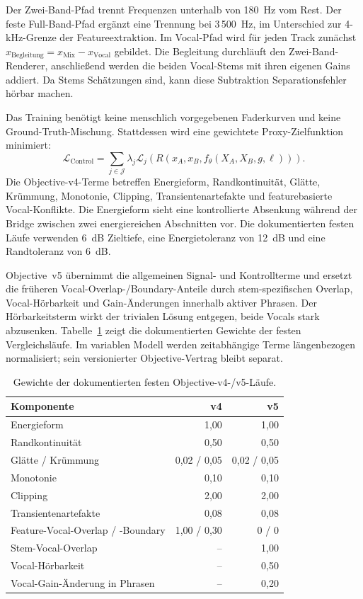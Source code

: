 Der Zwei-Band-Pfad trennt Frequenzen unterhalb von 180~Hz vom Rest. Der feste Full-Band-Pfad ergänzt eine Trennung bei 3\,500~Hz, im Unterschied zur 4-kHz-Grenze der Featureextraktion. Im Vocal-Pfad wird für jeden Track zunächst $x_{\mathrm{Begleitung}}=x_{\mathrm{Mix}}-x_{\mathrm{Vocal}}$ gebildet. Die Begleitung durchläuft den Zwei-Band-Renderer, anschließend werden die beiden Vocal-Stems mit ihren eigenen Gains addiert. Da Stems Schätzungen sind, kann diese Subtraktion Separationsfehler hörbar machen.

Das Training benötigt keine menschlich vorgegebenen Faderkurven und keine Ground-Truth-Mischung. Stattdessen wird eine gewichtete Proxy-Zielfunktion minimiert:
\begin{equation}
 \mathcal{L}_{\mathrm{Control}}=
 \sum_{j\in\mathcal{J}}\lambda_j\mathcal{L}_j
       (R(x_A,x_B,f_\theta(X_A,X_B,g,\ell))).
\end{equation}
Die Objective-v4-Terme betreffen Energieform, Randkontinuität, Glätte, Krümmung, Monotonie, Clipping, Transientenartefakte und featurebasierte Vocal-Konflikte. Die Energieform sieht eine kontrollierte Absenkung während der Bridge zwischen zwei energiereichen Abschnitten vor. Die dokumentierten festen Läufe verwenden 6~dB Zieltiefe, eine Energietoleranz von 12~dB und eine Randtoleranz von 6~dB.

Objective~v5 übernimmt die allgemeinen Signal- und Kontrollterme und ersetzt die früheren Vocal-Overlap-/Boundary-Anteile durch stem-spezifischen Overlap, Vocal-Hörbarkeit und Gain-Änderungen innerhalb aktiver Phrasen. Der Hörbarkeitsterm wirkt der trivialen Lösung entgegen, beide Vocals stark abzusenken. Tabelle~\ref{tab:methodik-loss} zeigt die dokumentierten Gewichte der festen Vergleichsläufe. Im variablen Modell werden zeitabhängige Terme längenbezogen normalisiert; sein versionierter Objective-Vertrag bleibt separat.

\begin{table}[htbp]
 \centering
 \caption{Gewichte der dokumentierten festen Objective-v4-/v5-Läufe.}
 \label{tab:methodik-loss}
 \begin{tabular}{lrr}
  \toprule
  Komponente & v4 & v5 \\
  \midrule
  Energieform & 1,00 & 1,00 \\
  Randkontinuität & 0,50 & 0,50 \\
  Glätte / Krümmung & 0,02 / 0,05 & 0,02 / 0,05 \\
  Monotonie & 0,10 & 0,10 \\
  Clipping & 2,00 & 2,00 \\
  Transientenartefakte & 0,08 & 0,08 \\
  Feature-Vocal-Overlap / -Boundary & 1,00 / 0,30 & 0 / 0 \\
  Stem-Vocal-Overlap & -- & 1,00 \\
  Vocal-Hörbarkeit & -- & 0,50 \\
  Vocal-Gain-Änderung in Phrasen & -- & 0,20 \\
  \bottomrule
 \end{tabular}
\end{table}

